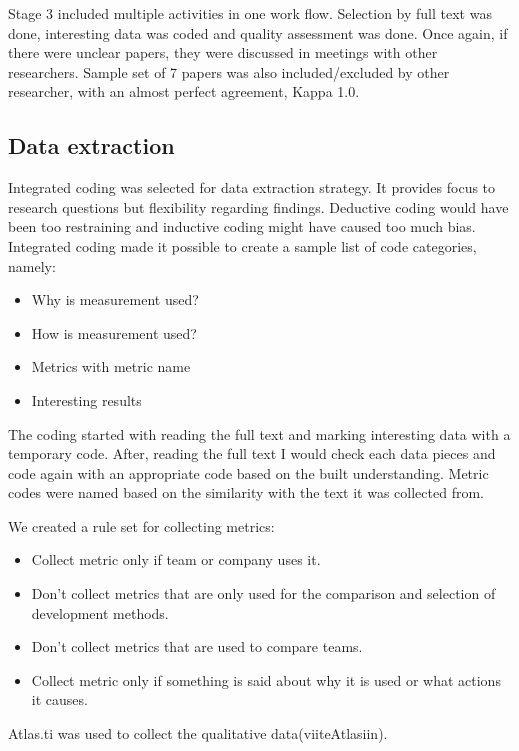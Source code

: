 \documentclass{sig-alternate}
\begin{document}
Stage 3 included multiple activities in one work flow. Selection by full text
was done, interesting data was coded and quality assessment was done. Once
again, if there were unclear papers, they were discussed in meetings with
other researchers. Sample set of 7 papers was also included/excluded by other
researcher, with an almost perfect agreement, Kappa
1.0\cite{landis_measurement_1977}.


\subsection{Data extraction}

Integrated coding was selected for data extraction
strategy\cite{6092576}. It provides focus to research questions but
flexibility regarding findings. Deductive coding would have been too
restraining and inductive coding might have caused too much bias. Integrated
coding made it possible to create a sample list of code categories, namely:

\begin{itemize}
  \item Why is measurement used?
  \item How is measurement used?
  \item Metrics with metric name
  \item Interesting results 
\end{itemize}

The coding started with reading the full text and marking interesting data
with a temporary code. After, reading the full text I would check each data
pieces and code again with an appropriate code based on the built
understanding. Metric codes were named based on the similarity with the text
it was collected from.

We created a rule set for collecting metrics:

\begin{itemize}
  \item Collect metric only if team or company uses it.
  \item Don't collect metrics that are only used for the comparison and
  selection of development methods.
  \item Don't collect metrics that are used to compare teams.
  \item Collect metric only if something is said about why it is used or what
  actions it causes. 
\end{itemize}

Atlas.ti was used to collect the qualitative data(viiteAtlasiin). 
\end{document}
